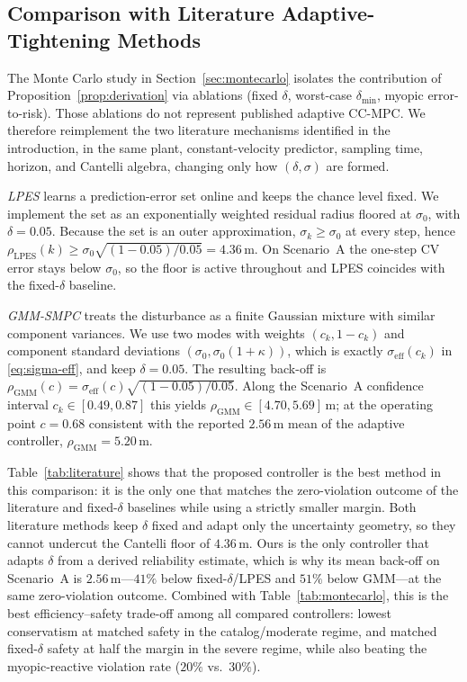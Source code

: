 \documentclass[letterpaper, 10 pt, conference]{ieeeconf}
\begin{document}
{\color{red}
\subsection{Comparison with Literature Adaptive-Tightening Methods}
\label{sec:literature-baselines}

The Monte Carlo study in Section~\ref{sec:montecarlo} isolates the contribution of Proposition~\ref{prop:derivation} via ablations (fixed $\delta$, worst-case $\delta_{\min}$, myopic error-to-risk). Those ablations do not represent published adaptive CC-MPC. We therefore reimplement the two literature mechanisms identified in the introduction, in the same plant, constant-velocity predictor, sampling time, horizon, and Cantelli algebra, changing only how $(\delta,\sigma)$ are formed.

\emph{LPES} \cite{ma2026sensor} learns a prediction-error set online and keeps the chance level fixed. We implement the set as an exponentially weighted residual radius floored at $\sigma_0$, with $\delta=0.05$. Because the set is an outer approximation, $\sigma_k\ge\sigma_0$ at every step, hence $\rho_{\mathrm{LPES}}(k)\ge\sigma_0\sqrt{(1-0.05)/0.05}=4.36\,\mathrm{m}$. On Scenario~A the one-step CV error stays below $\sigma_0$, so the floor is active throughout and LPES coincides with the fixed-$\delta$ baseline.

\emph{GMM-SMPC} \cite{engelaar2025stochastic} treats the disturbance as a finite Gaussian mixture with similar component variances. We use two modes with weights $(c_k,1-c_k)$ and component standard deviations $(\sigma_0,\sigma_0(1+\kappa))$, which is exactly $\sigma_{\mathrm{eff}}(c_k)$ in \eqref{eq:sigma-eff}, and keep $\delta=0.05$. The resulting back-off is $\rho_{\mathrm{GMM}}(c)=\sigma_{\mathrm{eff}}(c)\sqrt{(1-0.05)/0.05}$. Along the Scenario~A confidence interval $c_k\in[0.49,0.87]$ this yields $\rho_{\mathrm{GMM}}\in[4.70,5.69]\,\mathrm{m}$; at the operating point $c=0.68$ consistent with the reported $2.56\,\mathrm{m}$ mean of the adaptive controller, $\rho_{\mathrm{GMM}}=5.20\,\mathrm{m}$.

Table~\ref{tab:literature} shows that the proposed controller is the best method in this comparison: it is the only one that matches the zero-violation outcome of the literature and fixed-$\delta$ baselines while using a strictly smaller margin. Both literature methods keep $\delta$ fixed and adapt only the uncertainty geometry, so they cannot undercut the Cantelli floor of $4.36\,\mathrm{m}$. Ours is the only controller that adapts $\delta$ from a derived reliability estimate, which is why its mean back-off on Scenario~A is $2.56\,\mathrm{m}$---$41\%$ below fixed-$\delta$/LPES and $51\%$ below GMM---at the same zero-violation outcome. Combined with Table~\ref{tab:montecarlo}, this is the best efficiency--safety trade-off among all compared controllers: lowest conservatism at matched safety in the catalog/moderate regime, and matched fixed-$\delta$ safety at half the margin in the severe regime, while also beating the myopic-reactive violation rate ($20\%$ vs.\ $30\%$).

}
\end{document}
